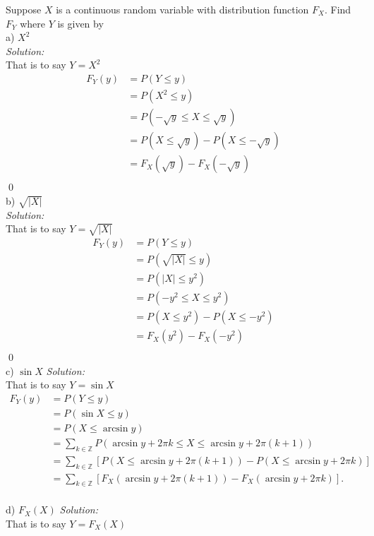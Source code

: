 \documentclass[10pt]{amsart}
\begin{document}
 Suppose $X$ is a continuous random variable with distribution function $F_X$. Find $F_Y$ where $Y$ is given by \\

\noindent a) $X^2$ \\
\textit{Solution:} \\
That is to say $Y = X^2$
\begin{align*}
F_Y(y) &= P(Y \leq y) \\
	   &= P(X^2 \leq y) \\
	   &= P(-\sqrt{y} \leq X \leq \sqrt{y}) \\
	   &= P(X \leq \sqrt{y})  - P(X \leq -\sqrt{y}) \\
	   &= F_X(\sqrt{y})  - F_X(-\sqrt{y}) \\
\end{align*}
\qed
\\
\noindent b) $\sqrt{|X|}$ \\
\textit{Solution:} \\
That is to say $Y = \sqrt{|X|}$
\begin{align*}
F_Y(y) &= P(Y \leq y) \\
	   &= P(\sqrt{|X|} \leq y) \\
	   &= P(|X| \leq y^2) \\
	   &= P(-y^2 \leq X \leq y^2) \\
	   &= P(X \leq y^2)  - P(X \leq -y^2) \\
	   &= F_X(y^2)  - F_X(-y^2) \\
\end{align*}
\qed
\\
\noindent c) $\sin X$ \textit{Solution:} \\
That is to say $Y = \sin X$
\begin{align*}
F_Y(y) &= P(Y \leq y) \\
	   &= P(\sin X \leq y) \\
	   &= P( X \leq \arcsin y ) \\
	   &= \sum_{k \in \mathbb{Z}}P(\arcsin y + 2\pi k \leq X \leq \arcsin y + 2\pi (k + 1) ) \\
	   &= \sum_{k \in \mathbb{Z}} \left[ P(X \leq \arcsin y + 2\pi (k + 1) ) - P(X \leq \arcsin y + 2\pi k)\right] \\
	   &= \sum_{k \in \mathbb{Z}} \left[ F_X(\arcsin y + 2\pi (k + 1) ) - F_X(\arcsin y + 2\pi k)\right].
\end{align*}
\\
\noindent d) $F_X(X)$ \textit{Solution:} \\
That is to say $Y = F_X(X)$
\end{document}
